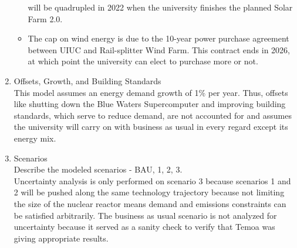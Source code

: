\begin{enumerate}
\begin{itemize}
    will be quadrupled in 2022 when the university finishes the planned Solar Farm 2.0.
    \item The cap on wind energy is due to the 10-year power purchase agreement
    between UIUC and Rail-splitter Wind Farm. This contract ends in 2026, at
    which point the university can elect to purchase more or not.
  \end{itemize}
  \item Offsets, Growth, and Building Standards \\
  This model assumes an energy demand growth of 1\% per year. Thus, offsets like
  shutting down the Blue Waters Supercomputer and improving building standards,
  which serve to reduce demand, are not accounted for and assumes the university
  will carry on with business as usual in every regard except its energy mix.
  \item Scenarios \\
  Describe the modeled scenarios - BAU, 1, 2, 3. \\
  Uncertainty analysis is only performed on scenario 3 because scenarios 1 and 2
  will be pushed along the same technology trajectory because not limiting the
  size of the nuclear reactor means demand and emissions constraints can be
  satisfied arbitrarily. The business as usual scenario is not analyzed for
  uncertainty because it served as a sanity check to verify that Temoa was giving
  appropriate results.
\end{enumerate}
